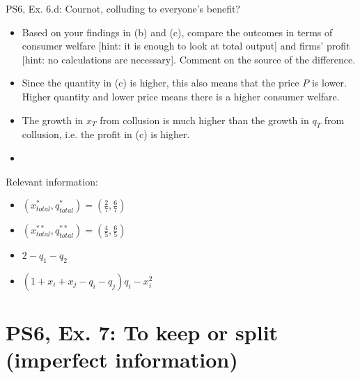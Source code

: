 \begin{frame}{PS6, Ex. 6.d: Cournot, colluding to everyone's benefit?}
    \begin{itemize}
    \item[(d)] Based on your findings in (b) and (c), compare the outcomes in terms of consumer welfare [hint: it is enough to look at total output] and firms’ profit [hint: no calculations are necessary]. Comment on the source of the difference.
    \end{itemize}
  \begin{multicols}{2}
    \begin{itemize}
      \item Since the quantity in (c) is higher, this also means that the price $P$ is lower. Higher quantity and lower price means there is a higher consumer welfare.
      \item The growth in $x_T$ from collusion is much higher than the growth in $q_T$ from collusion, i.e. the profit in (c) is higher.
      \item {}
    \end{itemize}
    \vfill\null \columnbreak
    Relevant information:
    \begin{itemize}
      \item[(b)] $(x_{total}^{*},q_{total}^{*})= \left(\frac{2}{7},\frac{6}{7}\right)$
      \item[(c)] $(x_{total}^{**},q_{total}^{**})= \left(\frac{4}{5},\frac{6}{5}\right)$
      \item[$P$:] $2-q_1-q_2$
      \item[$\pi_i:$] $(1+x_i+x_j-q_i-q_j)q_i-x_i^2$
    \end{itemize}
    \vfill\null
  \end{multicols}
\end{frame}




\section{PS6, Ex. 7: To keep or split (imperfect information)}

